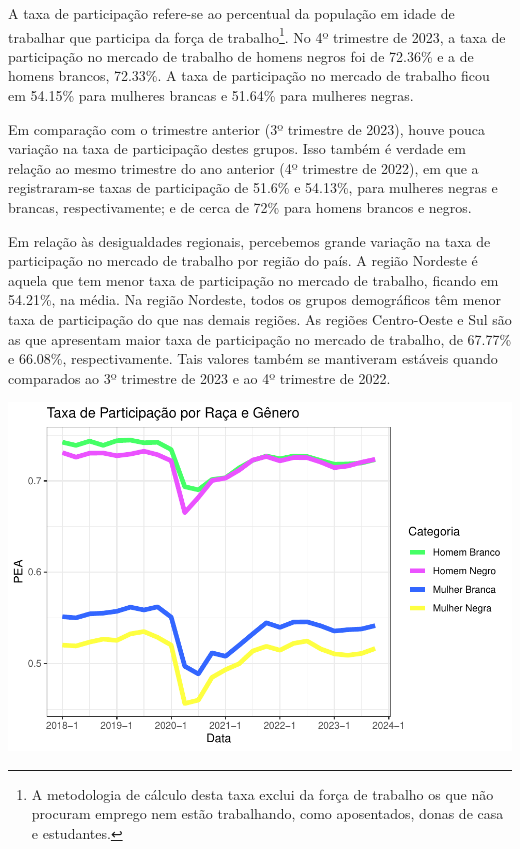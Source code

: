 \documentclass[
]{article}
\begin{document}
A taxa de participação refere-se ao percentual da população em idade de
trabalhar que participa da força de trabalho\footnote{A metodologia de
  cálculo desta taxa exclui da força de trabalho os que não procuram
  emprego nem estão trabalhando, como aposentados, donas de casa e
  estudantes.}. No 4º trimestre de 2023, a taxa de participação no
mercado de trabalho de homens negros foi de 72.36\% e a de homens
brancos, 72.33\%. A taxa de participação no mercado de trabalho ficou em
54.15\% para mulheres brancas e 51.64\% para mulheres negras.

Em comparação com o trimestre anterior (3º trimestre de 2023), houve
pouca variação na taxa de participação destes grupos. Isso também é
verdade em relação ao mesmo trimestre do ano anterior (4º trimestre de
2022), em que a registraram-se taxas de participação de 51.6\% e
54.13\%, para mulheres negras e brancas, respectivamente; e de cerca de
72\% para homens brancos e negros.

Em relação às desigualdades regionais, percebemos grande variação na
taxa de participação no mercado de trabalho por região do país. A região
Nordeste é aquela que tem menor taxa de participação no mercado de
trabalho, ficando em 54.21\%, na média. Na região Nordeste, todos os
grupos demográficos têm menor taxa de participação do que nas demais
regiões. As regiões Centro-Oeste e Sul são as que apresentam maior taxa
de participação no mercado de trabalho, de 67.77\% e 66.08\%,
respectivamente. Tais valores também se mantiveram estáveis quando
comparados ao 3º trimestre de 2023 e ao 4º trimestre de 2022.

\includegraphics{R-Markdown--Long-Version-_files/figure-latex/unnamed-chunk-5-1.pdf}
\end{document}
